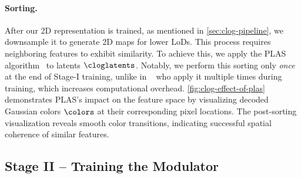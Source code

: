     \paragraph{Sorting.}
      After our 2D representation is trained, as mentioned in
      \cref{sec:clog-pipeline}, we downsample it to generate 2D maps for lower
      LoDs.
      This process requires neighboring features to exhibit similarity.
      To achieve this, we apply the PLAS
      algorithm~\cite{morgenstern2024compact} to latents $\cloglatents$.
      Notably, we perform this sorting only \emph{once} at the end of Stage-I
      training, unlike in ~\cite{morgenstern2024compact} who apply it multiple
      times during training, which increases computational overhead.
      \cref{fig:clog-effect-of-plas} demonstrates PLAS's impact on the feature space by visualizing decoded Gaussian colors $\colors$ at their corresponding pixel locations.
      The post-sorting visualization reveals smooth color transitions,
      indicating successful spatial coherence of similar features.

      
  \subsection{Stage II -- Training the Modulator}

